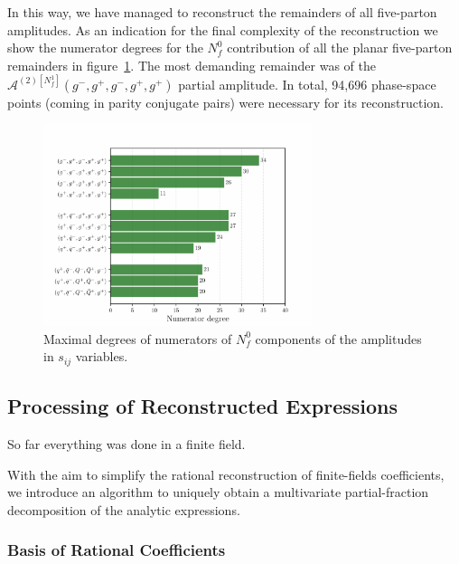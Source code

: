 In this way, we have managed to reconstruct the remainders of all five-parton amplitudes.
As an indication for the final complexity of the reconstruction we show the
numerator degrees for the $N_f^0$ contribution of all the planar five-parton
remainders in figure~\ref{fig:degrees-all}.
The most demanding remainder was of the $\mathcal{A}^{(2)[N_f^1]}(g^-,g^+,g^-,g^+,g^+)$ partial amplitude.
In total, 94,696 phase-space points  (coming in parity conjugate pairs) were necessary for its reconstruction.

\begin{figure}[ht]
  \centering
  \includegraphics[width = 0.7\textwidth]{plots/plot_sijs.pdf}
  \caption{Maximal degrees of numerators of $N_f^0$ components of the amplitudes in $s_{ij}$ variables.}
  \label{fig:degrees-all}
\end{figure}



\subsection{Processing of Reconstructed Expressions}
%
So far everything was done in a finite field.

With the aim to simplify the rational reconstruction of finite-fields coefficients, we
introduce an algorithm to uniquely obtain a multivariate partial-fraction decomposition of the analytic expressions.

\subsubsection{Basis of Rational Coefficients}

